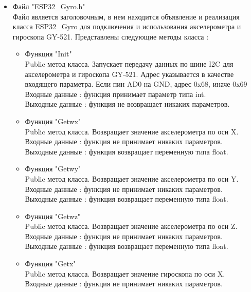 \documentclass[a4document]{article}
\begin{document}
{\begin{itemize}
    \item Файл "ESP32\_Gyro.h" \\
        Файл является заголовочным, в нем находится объявление и реализация класса ESP32\_Gyro
        для подключения и использования акселерометра и гироскопа GY-521.
        Представлены следующие методы класса : 
        \begin{itemize}
            \item Функция "Init" \\ 
                Public метод класса. Запускает передачу данных по шине I2C для акселерометра и гироскопа GY-521. 
                Адрес указывается в качестве входящего параметра. Если пин AD0 на GND, адрес 0x68, иначе 0x69 \\
                Входные данные : функция принимает параметр типа int. \\
                Выходные данные : функция не возвращает никаких параметров.
            \item Функция "Getwx" \\ 
                Public метод класса. Возвращает значение акселерометра по оси X.\\
                Входные данные : функция не принимает никаких параметров. \\
                Выходные данные : функция возвращает переменную типа float.
            \item Функция "Getwy" \\ 
                Public метод класса. Возвращает значение акселерометра по оси Y.\\
                Входные данные : функция не принимает никаких параметров. \\
                Выходные данные : функция возвращает переменную типа float.
            \item Функция "Getwz" \\ 
                Public метод класса. Возвращает значение акселерометра по оси Z.\\
                Входные данные : функция не принимает никаких параметров. \\
                Выходные данные : функция возвращает переменную типа float.
            \newpage
            \item Функция "Getx" \\ 
                Public метод класса. Возвращает значение гироскопа по оси X.\\
                Входные данные : функция не принимает никаких параметров. \\

\end{itemize}
\end{itemize}}
\end{document}
